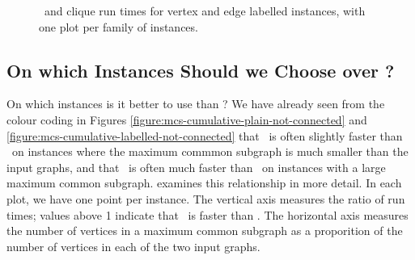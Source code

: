 \begin{figure}[htb]
{        \label{figure:mcs33ved-runtime-mcsplitdown-clique-bv}
    }
    \caption{\McSplitDown\ and clique run times for vertex and edge labelled instances, with one plot per family of instances.}
    \label{figure:mcs33ved-runtime-mcsplitdown-clique-scatters}
\end{figure}


\FloatBarrier


\subsection{On which Instances Should we Choose \McSplit{$\downarrow$}
    over \McSplit?}\label{sec:which-mcsplit-down}

On which instances is it better to use \McSplit{$\downarrow$} than \McSplit?
We have already seen from the colour coding in Figures
\ref{figure:mcs-cumulative-plain-not-connected} and
\ref{figure:mcs-cumulative-labelled-not-connected}
that \McSplit\ is often slightly faster than \McSplitDown\ on instances where
the maximum commmon subgraph is much smaller than the input graphs, and that
\McSplitDown\ is often much faster than \McSplit\ on instances with a large
maximum common subgraph.  
examines this relationship in more detail.  In each plot, we have one
point per instance.  The vertical axis measures the ratio of run times;
values above 1 indicate that \McSplitDown\ is faster than \McSplit.
The horizontal axis measures the number of vertices in a maximum
common subgraph as a proporition of the number of vertices in each
of the two input graphs.

